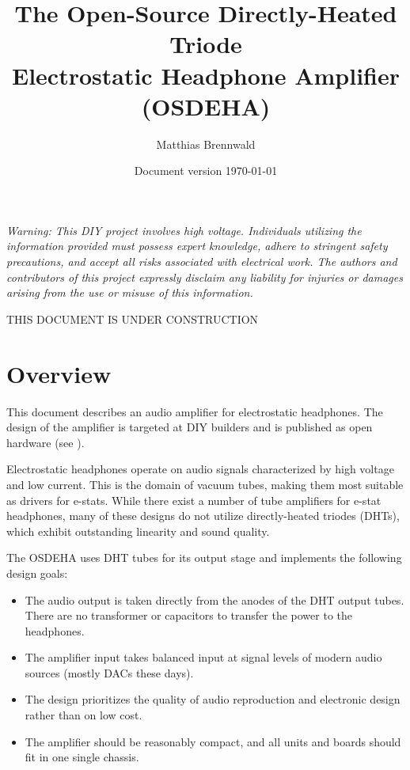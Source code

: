 





\title{The Open-Source Directly-Heated Triode \\ Electrostatic Headphone Amplifier \\ (OSDEHA)}
\author{Matthias Brennwald}
\date{Document version \today}




\maketitle

\emph{Warning: This DIY project involves high voltage. Individuals utilizing the information provided must possess expert knowledge, adhere to stringent safety precautions, and accept all risks associated with electrical work. The authors and contributors of this project expressly disclaim any liability for injuries or damages arising from the use or misuse of this information.}


THIS DOCUMENT IS UNDER CONSTRUCTION


\section{Overview}

This document describes an audio amplifier for electrostatic headphones. The design of the amplifier is targeted at DIY builders and is published as open hardware (see ).

Electrostatic headphones operate on audio signals characterized by high voltage and low current. This is the domain of vacuum tubes, making them most suitable as drivers for e-stats.  While there exist a number of tube amplifiers for e-stat headphones, many of these designs do not utilize directly-heated triodes (DHTs), which exhibit outstanding linearity and sound quality.\par

The OSDEHA uses DHT tubes for its output stage and implements the following design goals:
\begin{itemize}
\item The audio output is taken directly from the anodes of the DHT output tubes. There are no transformer or capacitors to transfer the power to the headphones.
\item The amplifier input takes balanced input at signal levels of modern audio sources (mostly DACs these days).
\item The design prioritizes the quality of audio reproduction and electronic design rather than on low cost.
\item The amplifier should be reasonably compact, and all units and boards should fit in one single chassis.
\end{itemize}

